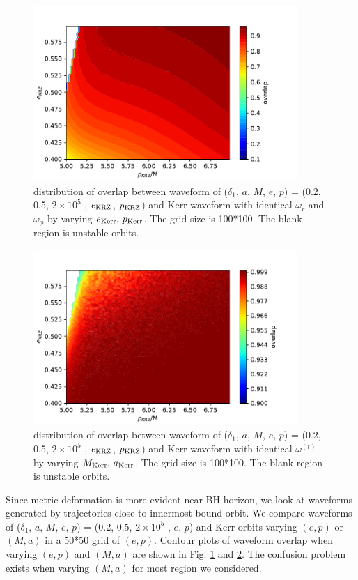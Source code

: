 \documentclass{article}
\begin{document}
	\begin{figure}[!h]
	\centering
	\includegraphics[width=10cm]{ep_best_dist.pdf}
	
	\caption{distribution of overlap between waveform of ($\delta_1,\, a,\, M,\, e,\, p$) = (0.2, 0.5, $2 \times 10^5 $ , $e_{\rm{KRZ}}$, $p_{\rm{KRZ}}$) and Kerr waveform with identical $\omega_r$ and $\omega_\phi$ by varying $e_{\rm{Kerr}},\, p_{\rm{Kerr}}$. The grid size is 100*100. The blank region is unstable orbits.}
	\label{epdist}
\end{figure}	

	\begin{figure}[!ht]
	\centering
	\includegraphics[width=10cm]{FF_am.pdf}
	
	\caption{distribution of overlap between waveform of ($\delta_1,\, a,\, M,\, e,\, p$) = (0.2, 0.5, $2 \times 10^5 $ , $e_{\rm{KRZ}}$, $p_{\rm{KRZ}}$) and Kerr waveform with identical $\omega^{(t)}$ by varying $M_{\rm{Kerr}},\, a_{\rm{Kerr}}$. The grid size is 100*100. The blank region is unstable orbits.}
	\label{amdist}
\end{figure}	

Since metric deformation is more evident near BH horizon, we look at waveforms generated by trajectories close to innermost bound orbit. We compare waveforms of ($\delta_1,\, a,\, M,\, e,\, p$) = (0.2, 0.5, $2 \times 10^5 $ , $e$, $p$) and Kerr orbits varying $(e,p)$ or $(M,a)$ in a 50*50 grid of $(e,p)$. Contour plots of waveform overlap when varying $(e,p)$ and $(M,a)$ are shown in Fig. \ref{epdist} and \ref{amdist}. The confusion problem exists when varying $(M,a)$ for most region we considered. 
\end{document}
